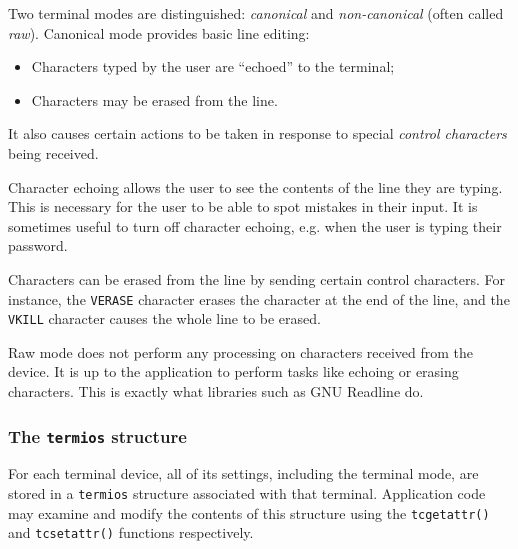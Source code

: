 \documentclass[shortabstract, manyadvisors, english, mgr]{iithesis}
\begin{document}
Two terminal modes are distinguished: \textit{canonical} and
\textit{non-canonical} (often called \textit{raw}). Canonical mode provides
basic line editing:
\begin{itemize}
  \item{Characters typed by the user are ``echoed'' to the terminal;}
  \item{Characters may be erased from the line.}
\end{itemize}
It also causes certain actions to be taken in response to special
\textit{control characters} being received.

Character echoing allows the user to see the contents of the line they are
typing. This is necessary for the user to be able to spot mistakes in their
input. It is sometimes useful to turn off character echoing, e.g. when the user
is typing their password.

Characters can be erased from the line by sending certain control characters.
For instance, the \texttt{VERASE} character erases the character at the end of
the line, and the \texttt{VKILL} character causes the whole line to be erased.

Raw mode does not perform any processing on characters received from the device.
It is up to the application to perform tasks like echoing or erasing characters.
This is exactly what libraries such as GNU Readline do.

\subsubsection{The \texttt{termios} structure}

For each terminal device, all of its settings, including the terminal mode, are
stored in a \texttt{termios} structure associated with that terminal.
Application code may examine and modify the contents of this structure using the
\texttt{tcgetattr()}\cite{tcgetattr} and \texttt{tcsetattr()}\cite{tcsetattr} functions respectively.
\end{document}
